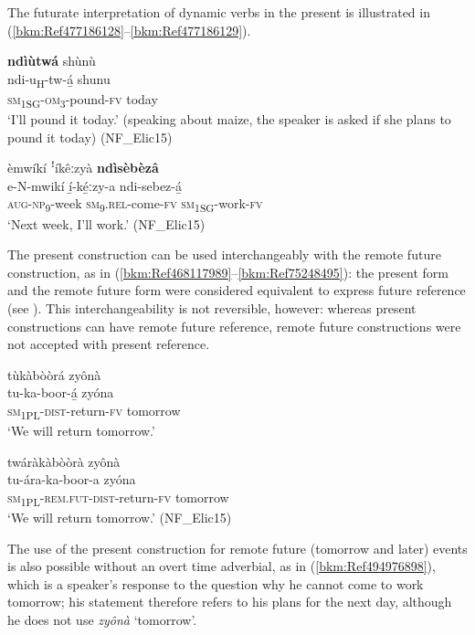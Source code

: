 The futurate interpretation of dynamic verbs in the present is illustrated in (\ref{bkm:Ref477186128}--\ref{bkm:Ref477186129}).

\ea
\label{bkm:Ref477186128}
\textbf{ndìùtwá} shùnù\\
\gll ndi-u\textsubscript{H}-tw-á̲      shunu\\
\textsc{sm}\textsubscript{1SG}-\textsc{om}\textsubscript{3}-pound-\textsc{fv}  today\\
\glt ‘I’ll pound it today.’ (speaking about maize, the speaker is asked if she plans to pound it today) (NF\_Elic15)
\z

\ea
\label{bkm:Ref477186129}
èmwíkí ꜝíkêːzyà \textbf{ndìsèbèzâ}\\
\gll e-N-mwikí    í̲-ké̲ːzy-a    ndi-sebez-á̲\\
\textsc{aug}-\textsc{np}\textsubscript{9}-week  \textsc{sm}\textsubscript{9}.\textsc{rel}-come-\textsc{fv}  \textsc{sm}\textsubscript{1SG}-work-\textsc{fv}\\
\glt ‘Next week, I’ll work.’ (NF\_Elic15)
\z

The present construction can be used interchangeably with the remote future construction, as in (\ref{bkm:Ref468117989}--\ref{bkm:Ref75248495}): the present form and the remote future form were considered equivalent to express future reference (see ). This interchangeability is not reversible, however: whereas present constructions can have remote future reference, remote future constructions were not accepted with present reference.

\ea
\label{bkm:Ref468117989}
tùkàbòòrá zyônà\\
\gll tu-ka-boor-á̲      zyóna\\
\textsc{sm}\textsubscript{1PL}-\textsc{dist}-return-\textsc{fv}  tomorrow\\
\glt ‘We will return tomorrow.’
\z

\ea
\label{bkm:Ref75248495}
twáràkàbòòrà zyônà\\
\gll tu-ára-ka-boor-a      zyóna\\
\textsc{sm}\textsubscript{1PL}-\textsc{rem}.\textsc{fut}-\textsc{dist}-return-\textsc{fv}  tomorrow\\
\glt ‘We will return tomorrow.’ (NF\_Elic15)
\z

The use of the present construction for remote future (tomorrow and later) events is also possible without an overt time adverbial, as in (\ref{bkm:Ref494976898}), which is a speaker’s response to the question why he cannot come to work tomorrow; his statement therefore refers to his plans for the next day, a\-l\-though he does not use \textit{zyônà} ‘tomorrow’.


